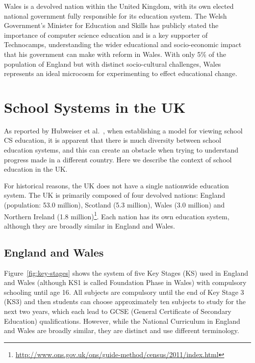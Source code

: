 \documentclass{sig-alternate}
\begin{document}
Wales is a devolved nation within the United Kingdom, with its own
elected national government fully responsible for its education
system. The Welsh Government's Minister for Education and Skills has
publicly stated the importance of computer science education and is a
key supporter of Technocamps, understanding the wider educational and
socio-economic impact that his government can make with reform in
Wales. With only 5\% of the population of England but with distinct
socio-cultural challenges, Wales represents an ideal microcosm for
experimenting to effect educational change.

\section{School Systems in the UK}\label{sec:schools}

As reported by Hubweiser et al.~\cite{hubwieser-et-al:2011}, when establishing a
model for viewing school CS education, it is apparent that there is
much diversity between school education systems, and this can create
an obstacle when trying to understand progress made in a different
country. Here we describe the context of school education in the UK.

For historical reasons, the UK does not have a single nationwide
education system.  The UK is primarily composed of four devolved
nations: England (population: 53.0 million), Scotland (5.3 million),
Wales (3.0 million) and Northern Ireland (1.8
million)\footnote{\url{http://www.ons.gov.uk/ons/guide-method/census/2011/index.html}}.
Each nation has its own education system, although they are broadly
similar in England and Wales.

\subsection{England and Wales}
Figure~\ref{fig:key-stages} shows the system of five Key Stages (KS)
used in England and Wales (although KS1 is called Foundation Phase in
Wales) with compulsory schooling until age 16. All subjects are
compulsory until the end of Key Stage 3 (KS3) and then students can
choose approximately ten subjects to study for the next two years,
which each lead to GCSE (General Certificate of Secondary Education)
qualifications. However, while the National Curriculum in England and
Wales are broadly similar, they are distinct and use different
terminology.
\end{document}
